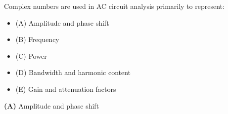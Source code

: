 

Complex numbers are used in AC circuit analysis primarily to represent:

\begin{itemize}
\item{(A)} Amplitude and phase shift
\vskip 5pt 
\item{(B)} Frequency
\vskip 5pt 
\item{(C)} Power
\vskip 5pt 
\item{(D)} Bandwidth and harmonic content
\vskip 5pt 
\item{(E)} Gain and attenuation factors
\end{itemize}







{\bf (A)} Amplitude and phase shift
 










